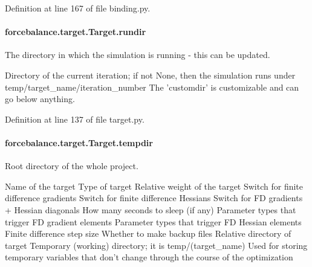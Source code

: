 Definition at line 167 of file binding.\-py.

\hypertarget{classforcebalance_1_1target_1_1Target_a6872de5b2d4273b82336ea5b0da29c9e}{
\paragraph[{rundir}]{\setlength{\rightskip}{0pt plus 5cm}forcebalance.\-target.\-Target.\-rundir\hspace{0.3cm}{\ttfamily [inherited]}}}\label{classforcebalance_1_1target_1_1Target_a6872de5b2d4273b82336ea5b0da29c9e}


The directory in which the simulation is running -\/ this can be updated. 

Directory of the current iteration; if not None, then the simulation runs under temp/target\-\_\-name/iteration\-\_\-number The 'customdir' is customizable and can go below anything.

Definition at line 137 of file target.\-py.

\hypertarget{classforcebalance_1_1target_1_1Target_aa1f01b5b78db253b5b66384ed11ed193}{
\paragraph[{tempdir}]{\setlength{\rightskip}{0pt plus 5cm}forcebalance.\-target.\-Target.\-tempdir\hspace{0.3cm}{\ttfamily [inherited]}}}\label{classforcebalance_1_1target_1_1Target_aa1f01b5b78db253b5b66384ed11ed193}


Root directory of the whole project. 

Name of the target Type of target Relative weight of the target Switch for finite difference gradients Switch for finite difference Hessians Switch for F\-D gradients + Hessian diagonals How many seconds to sleep (if any) Parameter types that trigger F\-D gradient elements Parameter types that trigger F\-D Hessian elements Finite difference step size Whether to make backup files Relative directory of target Temporary (working) directory; it is temp/(target\-\_\-name) Used for storing temporary variables that don't change through the course of the optimization 


